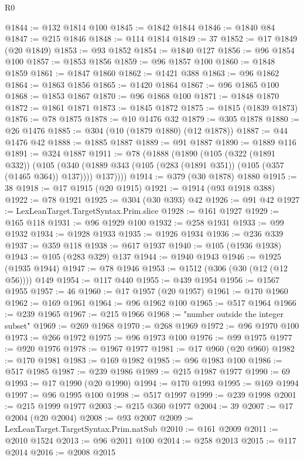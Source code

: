 \begin{lexlean}{R0}
\begin{coremodule}
@1844 := @132 @1814 @100
@1845 := @1842 @1844
@1846 := @1840 @84
@1847 := @215 @1846
@1848 := @114 @1814
@1849 := 37
@1852 := @17 @1849 (@20 @1849)
@1853 := @93 @1852
@1854 := @1840 @127
@1856 := @96 @1854 @100
@1857 := @1853 @1856
@1859 := @96 @1857 @100
@1860 := @1848 @1859
@1861 := @1847 @1860
@1862 := @1421 @388
@1863 := @96 @1862
@1864 := @1863 @1856
@1865 := @1420 @1864
@1867 := @96 @1865 @100
@1868 := @1853 @1867
@1870 := @96 @1868 @100
@1871 := @1848 @1870
@1872 := @1861 @1871
@1873 := @1845 @1872
@1875 := @1815 (@1839 @1873)
@1876 := @78 @1875
@1878 := @10 @1476 @32
@1879 := @305 @1878
@1880 := @26 @1476
@1885 := @304 (@10 (@1879 @1880) (@12 @1878))
@1887 := @44 @1476 @42
@1888 := @1885 @1887
@1889 := @91 @1887
@1890 := @1889 @116
@1891 := @324 @1887
@1911 := @78
    (@1888
      (@1890
        (@105
          (@322 (@1891 @332))
          (@105
            (@340 (@1889 @343 (@105 (@283 (@1891 @351)) (@105 (@357 (@1465 @364)) @137))))
            @137))))
@1914 := @379 (@30 @1878) @1880
@1915 := 38
@1918 := @17 @1915 (@20 @1915)
@1921 := @1914 (@93 @1918 @388)
@1922 := @78 @1921
@1925 := @304 (@30 @393) @42
@1926 := @91 @42
@1927 := LexLeanTarget.TargetSyntax.Prim.slice
@1928 := @161 @1927
@1929 := @165 @118
@1931 := @96 @1929 @100
@1932 := @258 @1931
@1933 := @99 @1932
@1934 := @1928 @1933
@1935 := @1926 @1934
@1936 := @236 @339
@1937 := @359 @118
@1938 := @617 @1937
@1940 := @105 (@1936 @1938)
@1943 := @105 (@283 @329) @137
@1944 := @1940 @1943
@1946 := @1925 (@1935 @1944)
@1947 := @78 @1946
@1953 := @1512 (@306 (@30 (@12 (@12 @56)))) @149
@1954 := @117 @440
@1955 := @439 @1954
@1956 := @1567 @1955
@1957 := 46
@1960 := @17 @1957 (@20 @1957)
@1961 := @170 @1960
@1962 := @169 @1961
@1964 := @96 @1962 @100
@1965 := @517 @1964
@1966 := @239 @1965
@1967 := @215 @1966
@1968 := "number outside the integer subset"
@1969 := @269 @1968
@1970 := @268 @1969
@1972 := @96 @1970 @100
@1973 := @266 @1972
@1975 := @96 @1973 @100
@1976 := @99 @1975
@1977 := @920 @1976
@1978 := @1967 @1977
@1981 := @17 @960 (@20 @960)
@1982 := @170 @1981
@1983 := @169 @1982
@1985 := @96 @1983 @100
@1986 := @517 @1985
@1987 := @239 @1986
@1989 := @215 @1987 @1977
@1990 := 69
@1993 := @17 @1990 (@20 @1990)
@1994 := @170 @1993
@1995 := @169 @1994
@1997 := @96 @1995 @100
@1998 := @517 @1997
@1999 := @239 @1998
@2001 := @215 @1999 @1977
@2003 := @215 @360 @1977
@2004 := 39
@2007 := @17 @2004 (@20 @2004)
@2008 := @93 @2007
@2009 := LexLeanTarget.TargetSyntax.Prim.natSub
@2010 := @161 @2009
@2011 := @2010 @1524
@2013 := @96 @2011 @100
@2014 := @258 @2013
@2015 := @117 @2014
@2016 := @2008 @2015

\end{coremodule}
\end{lexlean}
